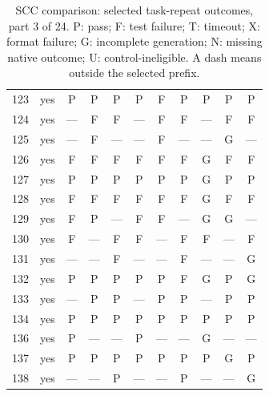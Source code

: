 \begin{table}[p]
\begin{tabular*}{\textwidth}{@{\extracolsep{\fill}}rc*{9}{c}@{}}
123 & yes & P & P & P & P & F & P & P & P & P\\
124 & yes & — & F & F & — & F & F & — & F & F\\
125 & yes & — & F & — & — & F & — & — & G & —\\
126 & yes & F & F & F & F & F & F & G & F & F\\
127 & yes & P & P & P & P & P & P & G & P & P\\
128 & yes & F & F & F & F & F & F & G & F & F\\
129 & yes & F & P & — & F & F & — & G & G & —\\
130 & yes & F & — & F & F & — & F & F & — & F\\
131 & yes & — & — & F & — & — & F & — & — & G\\
132 & yes & P & P & P & P & P & F & G & P & G\\
133 & yes & — & P & P & — & P & P & — & P & P\\
134 & yes & P & P & P & P & P & P & P & P & P\\
136 & yes & P & — & — & P & — & — & G & — & —\\
137 & yes & P & P & P & P & P & P & P & G & P\\
138 & yes & — & — & P & — & — & P & — & — & G\\
\bottomrule\end{tabular*}
\caption{SCC comparison: selected task-repeat outcomes, part 3 of 24. P: pass; F: test failure; T: timeout; X: format failure; G: incomplete generation; N: missing native outcome; U: control-ineligible. A dash means outside the selected prefix.}
\end{table}
\clearpage
